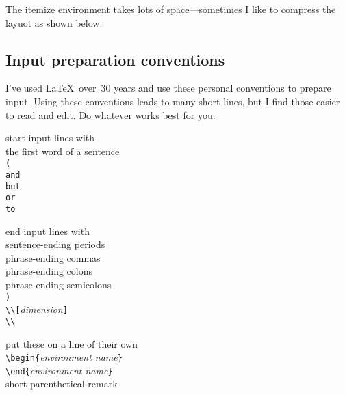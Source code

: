 The itemize environment takes lots of space---sometimes
I like to compress the layuot as shown below.

\subsection{Input preparation conventions}

I've used \LaTeX\ over~30 years
and use these personal conventions
to prepare input.
Using these conventions leads
to many short lines,
but I find those easier
to read and edit.
Do whatever works best for you.

 start input lines with\\
   the first word of a sentence\\
   \verb+(+\\
   \verb+and+\\
   \verb+but+\\
   \verb+or+\\
   \verb+to+

\NL
{} end input lines with\\
   sentence-ending periods\\
   phrase-ending commas\\
   phrase-ending colons\\
   phrase-ending semicolons\\
   \verb+)+\\
   \verb+\\[+\textit{dimension}\verb+]+\\
   \verb+\\+

\NL
{} put these on a line of their own\\
   \verb+\begin{+\textit{environment name}\verb+}+\\
   \verb+\end{+\textit{environment name}\verb+}+\\
   short parenthetical remark


